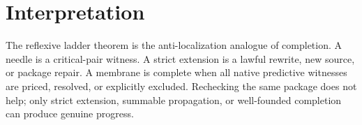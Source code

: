 \documentclass[11pt]{article}
\begin{document}
\section{Interpretation}
The reflexive ladder theorem is the anti-localization analogue of completion.  A needle is a critical-pair witness.  A strict extension is a lawful rewrite, new source, or package repair.  A membrane is complete when all native predictive witnesses are priced, resolved, or explicitly excluded.  Rechecking the same package does not help; only strict extension, summable propagation, or well-founded completion can produce genuine progress.
\end{document}
